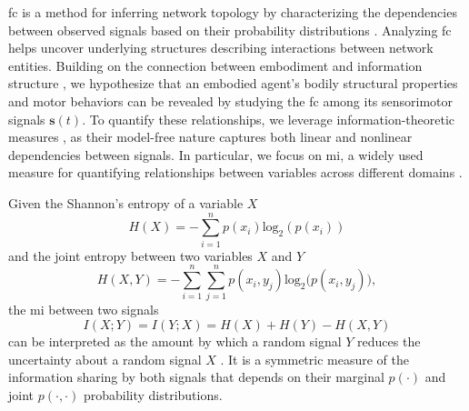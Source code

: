 
\ac{fc} is a method for inferring network topology by characterizing the dependencies between observed signals based on their probability distributions \cite{Friston2011Functionaleffectiveconnectivity}. Analyzing \ac{fc} helps uncover underlying structures describing interactions between network entities. Building on the connection between embodiment and information structure \cite{Pfeifer2007Selforganizationembodiment}, we hypothesize that an embodied agent’s bodily structural properties and motor behaviors can be revealed by studying the \ac{fc} among its sensorimotor signals $\bm{s}(t)$. To quantify these relationships, we leverage information-theoretic measures \cite{Bonsignorio2020EntropyBasedMetrics,Bonsignorio2013Quantifyingevolutionaryself}, as their model-free nature captures both linear and nonlinear dependencies between signals. In particular, we focus on \ac{mi}, a widely used measure for quantifying relationships between variables across different domains \cite{Steuer2002mutualinformationdetecting}.

Given the Shannon's entropy of a variable $X$  
\begin{equation}\label{eq:entropy}
	H(X) = -\sum_{i=1}^{n}p(x_i)\text{log}_2\left(p\left(x_i\right)\right)
\end{equation}
and the joint entropy between two variables $ X $ and $ Y $ 
\begin{equation}\label{eq:joint_entropy}
	H(X,Y) = -\sum_{i=1}^{n}\sum_{j=1}^{n} p(x_i,y_j)\text{log}_2\big(p\left(x_i,y_j\right)\big),
\end{equation}
the \ac{mi} between two signals 
\begin{equation}\label{eq:mutual_information}
	I\left(X;Y\right) =I\left(Y;X\right) = H(X) + H(Y) - H(X,Y)
\end{equation}
can be interpreted as the amount by which a random signal $ Y $ reduces the uncertainty about a random signal $ X $ \cite{Cover1999Elementsinformationtheory}. It is a symmetric measure of the information sharing by both signals that depends on their marginal $p(\cdot)$ and joint $p(\cdot,\cdot)$ probability distributions.

